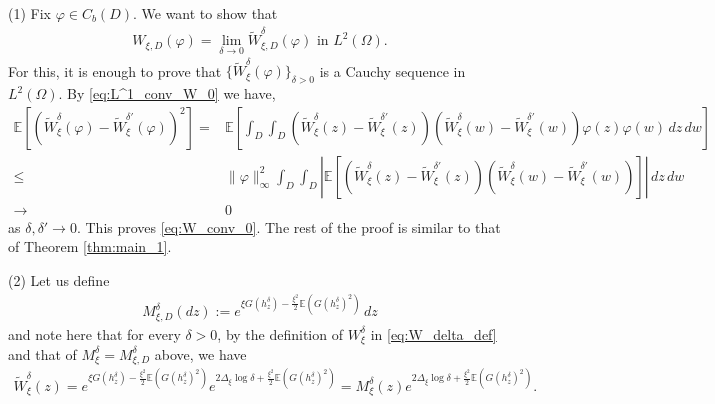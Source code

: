 \documentclass[a4paper, 11pt, reqno]{amsart}
\theoremstyle{definition} \newtheorem{defn}{Definition}[section]
\theoremstyle{remark} \newtheorem{rem}[defn]{Remark}
\theoremstyle{remark} \newtheorem*{rem*}{Remark}
\theoremstyle{plain} \newtheorem{thm}[defn]{Theorem}
\theoremstyle{plain} \newtheorem{lem}[defn]{Lemma}
\theoremstyle{plain} \newtheorem{prop}[defn]{Proposition}
\theoremstyle{plain} \newtheorem{cor}[defn]{Corollary}
\theoremstyle{remark} \newtheorem{exm}[defn]{\textbf{Example}}
\theoremstyle{remark} \newtheorem{exms}[defn]{\textbf{Examples}}
\theoremstyle{remark} \newtheorem*{bl}{}
\numberwithin{equation}{section} %
\newcommand{\E}{\mathbb{E}}
\begin{document}
    (1) Fix $\varphi \in C_b(D)$. We want to show that 
    \begin{align}\label{eq:W_conv_0}
			W_{\xi,D}(\varphi) = \lim_{\delta \to 0} \tilde{W}^{\delta}_{\xi, D} (\varphi) \text{ in } L^2(\Omega).
    \end{align}	
	 For this, it is enough to prove that $\{\tilde{W}^{\delta}_{\xi}(\varphi)\}_{\delta>0}$ is a Cauchy sequence in $L^2(\Omega)$. By \eqref{eq:L^1_conv_W_0} we have,  
		\begin{align}\label{eq:W_conv_8}
			\E \left[(\tilde{W}^{\delta}_{\xi} (\varphi) - \tilde{W}^{\delta'}_{\xi}(\varphi))^2\right]
			= &  \E \left[ \int_D \int_D (\tilde{W}^{\delta}_{\xi}(z) - \tilde{W}^{\delta'}_{\xi}(z)) (\tilde{W}^{\delta}_{\xi}(w) - \tilde{W}^{\delta'}_{\xi}(w)) \varphi(z)\varphi(w) \, dz \, dw \right]
			\nonumber \\
			\le & \lVert \varphi \rVert_{\infty}^2 \int_D \int_D |\E[(\tilde{W}^{\delta}_{\xi}(z) - \tilde{W}^{\delta'}_{\xi}(z)) (\tilde{W}^{\delta}_{\xi}(w) - \tilde{W}^{\delta'}_{\xi}(w))] |  \, dz \, dw 
			\nonumber \\
			\to & 0
		\end{align}
		as $\delta, \delta' \to 0$. This proves \eqref{eq:W_conv_0}. The rest of the proof is similar to that of Theorem \ref{thm:main_1}.

    (2) Let us define 
			\begin{align}\label{eq:M_approx}
				M^{\delta}_{\xi, D}(dz) := e^{\xi G(h^{\delta}_z) - \frac{\xi^2}{2} \E(G(h^{\delta}_z)^2)} \, dz
			\end{align} 
        and note here that for every $\delta>0$, by the definition of $W^{\delta}_{\xi}$ in \eqref{eq:W_delta_def} and that of $M^{\delta}_{\xi} = M^{\delta}_{\xi, D}$ above, we have
		\begin{align}\label{eq:W_M_1}
			\tilde{W}^{\delta}_{\xi}(z) =   e^{\xi G(h^{\delta}_z) - \frac{\xi^2}{2}\E(G(h^{\delta}_z)^2)} e^{2\Delta_{\xi} \log \delta + \frac{\xi^2}{2} \E(G(h^{\delta}_z)^2) }
			=  M^{\delta}_{\xi} (z) e^{2\Delta_{\xi} \log \delta + \frac{\xi^2}{2} \E(G(h^{\delta}_z)^2) }.
		\end{align}
		
\end{document}
